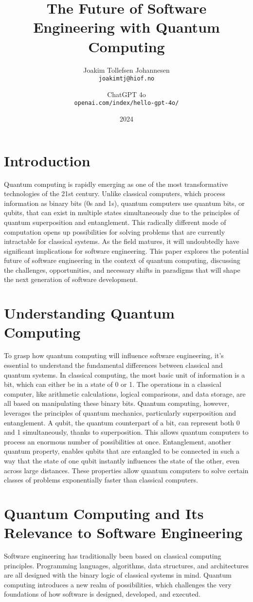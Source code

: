 \documentclass{article}
\title{The Future of Software Engineering with Quantum Computing}
\author{
    Joakim Tollefsen Johannesen\\
    \texttt{joakimtj@hiof.no}
    \and 
    ChatGPT 4o\\
    \texttt{openai.com/index/hello-gpt-4o/}
}
\date{2024}
\begin{document}
\maketitle

\section{Introduction}
Quantum computing is rapidly emerging as one of the most transformative technologies of the 21st century. Unlike classical computers, which process information as binary bits (0s and 1s), quantum computers use quantum bits, or qubits, that can exist in multiple states simultaneously due to the principles of quantum superposition and entanglement. This radically different mode of computation opens up possibilities for solving problems that are currently intractable for classical systems. As the field matures, it will undoubtedly have significant implications for software engineering. This paper explores the potential future of software engineering in the context of quantum computing, discussing the challenges, opportunities, and necessary shifts in paradigms that will shape the next generation of software development.

\section{Understanding Quantum Computing}
To grasp how quantum computing will influence software engineering, it's essential to understand the fundamental differences between classical and quantum systems. In classical computing, the most basic unit of information is a bit, which can either be in a state of 0 or 1. The operations in a classical computer, like arithmetic calculations, logical comparisons, and data storage, are all based on manipulating these binary bits.
Quantum computing, however, leverages the principles of quantum mechanics, particularly superposition and entanglement. A qubit, the quantum counterpart of a bit, can represent both 0 and 1 simultaneously, thanks to superposition. This allows quantum computers to process an enormous number of possibilities at once. Entanglement, another quantum property, enables qubits that are entangled to be connected in such a way that the state of one qubit instantly influences the state of the other, even across large distances. These properties allow quantum computers to solve certain classes of problems exponentially faster than classical computers.

\section{Quantum Computing and Its Relevance to Software Engineering}
Software engineering has traditionally been based on classical computing principles. Programming languages, algorithms, data structures, and architectures are all designed with the binary logic of classical systems in mind. Quantum computing introduces a new realm of possibilities, which challenges the very foundations of how software is designed, developed, and executed.
\end{document}
